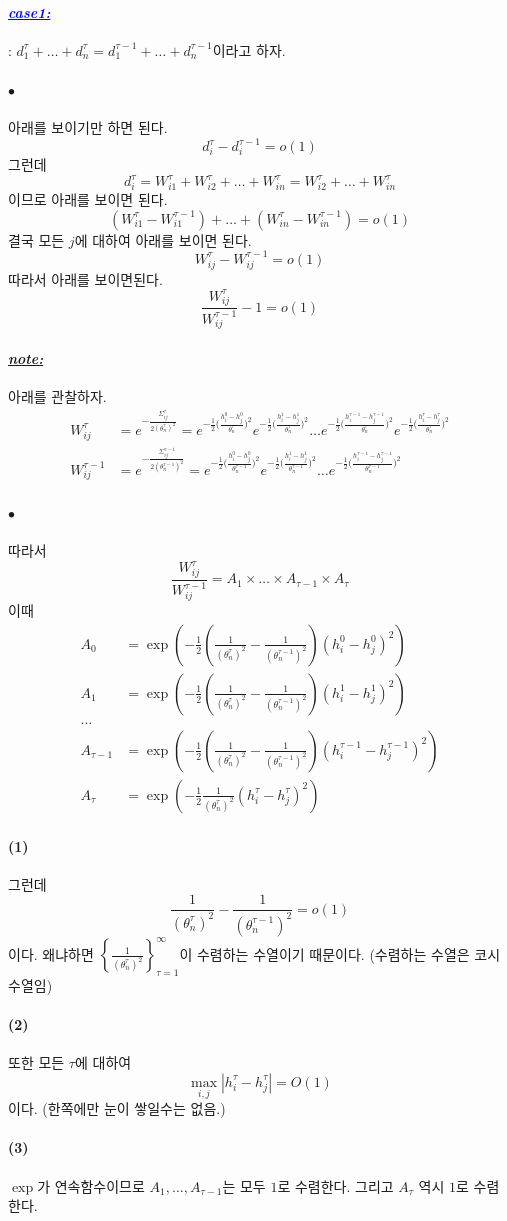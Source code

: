 \documentclass[12pt,oneside,english,a4paper]{article}
\def\ck{\paragraph{\LARGE$\bullet$}\LARGE}
\def\note{\paragraph{\LARGE\textit{\underline{note:}}}\LARGE}
\newcommand{\parablue}[1]{\paragraph{\LARGE\textcolor{blue}{\it\underline{\textbf{#1:}}}}\LARGE}
\def\one{\paragraph{\large(1)}\LARGE}
\def\two{\paragraph{\LARGE(2)}\LARGE}
\def\three{\paragraph{\LARGE(3)}\LARGE}
\begin{document}
\parablue{case1} : $d_1^{\tau}+\dots+d_n^{\tau}=d_1^{\tau-1}+\dots+d_n^{\tau-1}$이라고 하자. 
\ck 아래를 보이기만 하면 된다. 
\[
d_i^{\tau}-d_i^{\tau-1}=o(1)
\]
그런데 
\[
d_i^{\tau}=W_{i1}^{\tau}+W_{i2}^{\tau}+\dots+W_{in}^{\tau}=W_{i2}^{\tau}+\dots+W_{in}^{\tau}
\]
이므로 아래를 보이면 된다. 
\[
(W_{i1}^{\tau}-W_{i1}^{\tau-1})+\dots+(W_{in}^{\tau}-W_{in}^{\tau-1})=o(1)
\]
결국 모든 $j$에 대하여 아래를 보이면 된다. 
\[
W_{ij}^{\tau}-W_{ij}^{\tau-1}=o(1)
\]
따라서 아래를 보이면된다. 
\[
\frac{W_{ij}^{\tau}}{W_{ij}^{\tau-1}}-1=o(1)
\]

\note 
아래를 관찰하자. 
\begin{align*}
W_{ij}^{\tau}&=e^{-\frac{\Sigma_{ij}^{\tau}}{2(\theta_n^{\tau})^2}}
=e^{-\frac{1}{2}\big(\frac{h_i^0-h_j^0}{\theta_n^{\tau}}\big)^2}
e^{-\frac{1}{2}\big(\frac{h_i^1-h_j^1}{\theta_n^{\tau}}\big)^2}
\dots
e^{-\frac{1}{2}\big(\frac{h_i^{\tau-1}-h_j^{\tau-1}}{\theta_n^{\tau}}\big)^2}
e^{-\frac{1}{2}\big(\frac{h_i^\tau-h_j^\tau}{\theta_n^{\tau}}\big)^2} \\
W_{ij}^{\tau-1}&=e^{-\frac{\Sigma_{ij}^{\tau-1}}{2(\theta_n^{\tau-1})^2}}
=e^{-\frac{1}{2}\big(\frac{h_i^0-h_j^0}{\theta_n^{\tau-1}}\big)^2}
e^{-\frac{1}{2}\big(\frac{h_i^1-h_j^1}{\theta_n^{\tau-1}}\big)^2}
\dots
e^{-\frac{1}{2}\big(\frac{h_i^{\tau-1}-h_j^{\tau-1}}{\theta_n^{\tau-1}}\big)^2}
\end{align*}

\ck 따라서 
\[
\frac{W_{ij}^{\tau}}{W_{ij}^{\tau-1}}
=A_1 \times \dots \times A_{\tau-1}\times A_\tau
\]
이때 
\begin{align*}
A_0&=\exp\left(-\frac{1}{2}\left(\frac{1}{(\theta_n^\tau)^2}-\frac{1}{(\theta_n^{\tau-1})^2}\right)(h_i^0-h_j^0)^2\right) \\
A_1&=\exp\left(-\frac{1}{2}\left(\frac{1}{(\theta_n^\tau)^2}-\frac{1}{(\theta_n^{\tau-1})^2}\right)(h_i^1-h_j^1)^2\right) \\
\dots \\
A_{\tau-1}&=\exp\left(-\frac{1}{2}\left(\frac{1}{(\theta_n^\tau)^2}-\frac{1}{(\theta_n^{\tau-1})^2}\right)(h_i^{\tau-1}-h_j^{\tau-1})^2\right) \\ 
A_{\tau}&=\exp\left(-\frac{1}{2}\frac{1}{(\theta_n^\tau)^2}(h_i^{\tau}-h_j^{\tau})^2\right)
\end{align*}

\one 그런데 
\[
\frac{1}{(\theta_n^\tau)^2}-\frac{1}{(\theta_n^{\tau-1})^2}=o(1)
\]
이다. 왜냐하면 $\left\{\frac{1}{(\theta_n^{\tau})^2}\right\}_{\tau=1}^{\infty}$이 수렴하는 수열이기 때문이다. (수렴하는 수열은 코시수열임) 
\two 또한 모든 $\tau$에 대하여 
\[
\max_{i,j}|h_i^{\tau}-h_j^{\tau}|=O(1)
\]
이다. (한쪽에만 눈이 쌓일수는 없음.) 
\three $\exp$가 연속함수이므로 $A_1,\dots,A_{\tau-1}$는 모두 $1$로 수렴한다. 그리고 $A_{\tau}$ 역시 $1$로 수렴한다.
\end{document}
